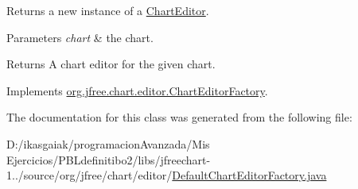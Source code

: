 Returns a new instance of a \mbox{\hyperlink{interfaceorg_1_1jfree_1_1chart_1_1editor_1_1_chart_editor}{Chart\+Editor}}.


\begin{DoxyParams}{Parameters}
{\em chart} & the chart.\\
\hline
\end{DoxyParams}
\begin{DoxyReturn}{Returns}
A chart editor for the given chart. 
\end{DoxyReturn}


Implements \mbox{\hyperlink{interfaceorg_1_1jfree_1_1chart_1_1editor_1_1_chart_editor_factory_aa5f9eeb23f352c7555ffad94af60c344}{org.\+jfree.\+chart.\+editor.\+Chart\+Editor\+Factory}}.



The documentation for this class was generated from the following file\+:\begin{DoxyCompactItemize}
\item 
D\+:/ikasgaiak/programacion\+Avanzada/\+Mis Ejercicios/\+P\+B\+Ldefinitibo2/libs/jfreechart-\/1../source/org/jfree/chart/editor/\mbox{\hyperlink{_default_chart_editor_factory_8java}{Default\+Chart\+Editor\+Factory.\+java}}\end{DoxyCompactItemize}
